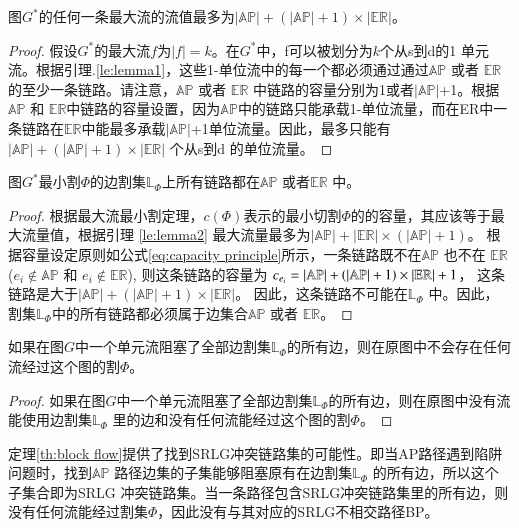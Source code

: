 \begin{lemma}
\label{le:lemma2}
    图$G^*$的任何一条最大流的流值最多为$|\mathbb{AP}|+(|\mathbb{AP}|+1)\times|\mathbb{\mathbb{ER}}|$。
\end{lemma}
\begin{proof}
假设$G^*$的最大流$f$为$|f|=k$。在$G^*$中，f可以被划分为$k$个从s到d的1 单元流。根据引理.\ref{le:lemma1}，这些1-单位流中的每一个都必须通过通过$\mathbb{AP}$ 或者 $\mathbb{\mathbb{ER}}$的至少一条链路。请注意，$\mathbb{AP}$ 或者 $\mathbb{\mathbb{ER}}$ 中链路的容量分别为1或者$|\mathbb{AP}|$+1。根据$\mathbb{AP}$ 和 $\mathbb{\mathbb{ER}}$中链路的容量设置，因为$\mathbb{AP}$中的链路只能承载1-单位流量，而在ER中一条链路在$\mathbb{ER}$中能最多承载$|\mathbb{AP}|$+1单位流量。因此，最多只能有$|\mathbb{AP}|+ (|\mathbb{AP}|+1)\times|\mathbb{\mathbb{ER}}|$ 个从s到d 的单位流量。
\end{proof}

\begin{lemma}
\label{le:lemma3}
    图$G^*$最小割$\Phi$的边割集$\mathbb{L}_{\Phi}$上所有链路都在$\mathbb{AP}$ 或者$\mathbb{\mathbb{ER}}$ 中。
\end{lemma}

\begin{proof}
根据最大流最小割定理，$c(\Phi)$表示的最小切割$\Phi$的的容量，其应该等于最大流量值，根据引理 \ref{le:lemma2} 最大流量最多为$|\mathbb{AP}|+ |\mathbb{ER}|\times (|\mathbb{AP}|+1)$。 根据容量设定原则如公式\ref{eq:capacity principle}所示，一条链路既不在$\mathbb{AP}$ 也不在 $\mathbb{ER}$ ($e_i \notin \mathbb{AP}$ 和 $e_i \notin \mathbb{ER}$), 则这条链路的容量为 $c_{e_i} = \left| {{\rm\mathbb{AP}}} \right| + \left( {\left| {{\rm\mathbb{AP}}} \right| + 1} \right)\times \left| {{\rm{\mathbb{E}}}{{\rm{\mathbb{R}}}}} \right| + 1$， 这条链路是大于$|\mathbb{AP}|+(|\mathbb{AP}|+1)\times |\mathbb{ER}|$。 因此，这条链路不可能在$\mathbb{L}_{\Phi}$ 中。因此，割集$\mathbb{L}_{\Phi}$中的所有链路都必须属于边集合$\mathbb{AP}$ 或者 $\mathbb{ER}$。
\end{proof}


\begin{theorem}
    如果在图$G$中一个单元流阻塞了全部边割集$\mathbb{L}_{\Phi}$的所有边，则在原图中不会存在任何流经过这个图的割$\Phi$。
\label{th:block flow}
\end{theorem}


\begin{proof}
    如果在图$G$中一个单元流阻塞了全部边割集$\mathbb{L}_{\Phi}$的所有边，则在原图中没有流能使用边割集$\mathbb{L}_{\Phi}$ 里的边和没有任何流能经过这个图的割$\Phi$。
\end{proof}
定理\ref{th:block flow}提供了找到SRLG冲突链路集的可能性。即当AP路径遇到陷阱问题时，找到$\mathbb{AP}$ 路径边集的子集能够阻塞原有在边割集$\mathbb{L}_{\Phi}$ 的所有边，所以这个子集合即为SRLG 冲突链路集。当一条路径包含SRLG冲突链路集里的所有边，则没有任何流能经过割集$\Phi$，因此没有与其对应的SRLG不相交路径BP。

